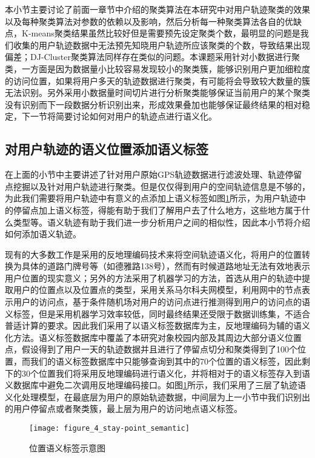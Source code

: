 \par 本小节主要讨论了前面一章节中介绍的聚类算法在本研究中对用户轨迹聚类的效果以及每种聚类算法对参数的依赖以及影响，然后分析每一种聚类算法各自的优缺点，K-means聚类结果虽然比较好但是需要预先设定聚类个数，最明显的问题是我们收集的用户轨迹数据中无法预先知晓用户轨迹所应该聚类的个数，导致结果出现偏差；DJ-Cluster聚类算法同样存在类似的问题。本课题采用针对小数据进行聚类，一方面是因为数据量小比较容易发现较小的聚类簇，能够识别用户更加细粒度的访问位置，如果将用户多天的轨迹数据进行聚类，有可能将会导致较大数量的簇无法识别。另外采用小数据量时间切片进行分析聚类能够保证当前用户的某个聚类没有识别而下一段数据分析识别出来，形成效果叠加也能够保证最终结果的相对稳定，下一节将简要讨论如何对用户的轨迹点进行语义化。
\subsection{对用户轨迹的语义位置添加语义标签}
\label{sec:section3-3}
\par 在上面的小节中主要讲述了针对用户原始GPS轨迹数据进行滤波处理、轨迹停留点挖掘以及针对用户轨迹进行聚类。但是仅仅得到用户的空间轨迹信息是不够的，为此我们需要将用户轨迹中有意义的点添加上语义标签如图\ref{fig:tra_senantic}所示，为用户轨迹中的停留点加上语义标签，得能有助于我们了解用户去了什么地方，这些地方属于什么类型等。语义轨迹有助于我们进一步分析用户之间的相似性，因此本小节将介绍如何添加语义轨迹。
\par 现有的大多数工作是采用的反地理编码技术来将空间轨迹语义化，将用户的位置转换为具体的道路门牌号等（如德雅路138号），然而有时候道路地址无法有效地表示用户位置的现实意义；另外的方法采用了机器学习的方法，首选从用户的轨迹中提取用户的位置点以及位置点的类型，采用关系马尔科夫网模型，利用网中的节点表示用户的访问点，基于条件随机场对用户的访问点进行推测得到用户的访问点的语义标签，但是采用机器学习效率较低，同时最终结果还受限于数据训练集，不适合普适计算的要求。因此我们采用了以语义标签数据库为主，反地理编码为辅的语义化方法。语义标签数据库中覆盖了本研究对象校园内部及其周边大部分语义位置点，假设得到了用户一天的轨迹数据并且进行了停留点切分和聚类得到了100个位置，而我们的语义标签数据库中只能够查询到其中的70个位置的语义标签，因此剩下的30个位置我们将采用反地理编码进行语义化，并将相对于的语义标签存入到语义数据库中避免二次调用反地理编码接口。如图\ref{fig:tra_senantic}所示，我们采用了三层了轨迹语义化处理模型，在最底层为用户的原始轨迹数据，中间层为上一小节中我们识别出的用户停留点或者聚类簇，最上层为用户的访问地点语义标签。
\begin{figure}[htp]
\centering
\texttt{[image: figure\_4\_stay-point\_semantic]}
\caption{位置语义标签示意图}
\label{fig:tra_senantic}
\end{figure}
